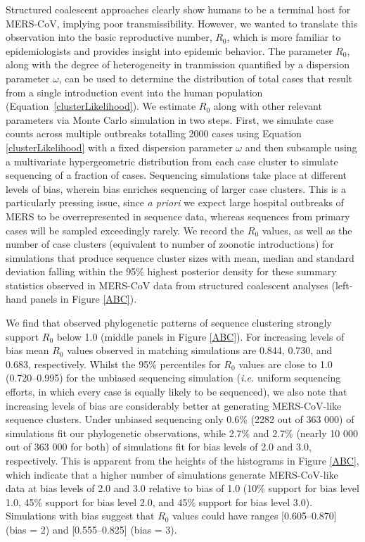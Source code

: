 \documentclass[11pt,oneside,letterpaper]{article}
\def\tbc#1{\textcolor{purple}{[#1]}}
\def\lmc#1{\textcolor{green}{[#1]}}
\begin{document}
Structured coalescent approaches clearly show humans to be a terminal host %
for MERS-CoV, implying poor transmissibility.
However, we wanted to translate this observation into the basic reproductive number, $R_{0}$, which is more familiar to epidemiologists and provides %
insight into epidemic behavior.
The parameter $R_{0}$, along with the degree of heterogeneity in tranmission quantified by a dispersion parameter $\omega$, can be used to determine the distribution of total cases that result from a single introduction event into the human population (Equation~\ref{clusterLikelihood}).
We estimate $R_{0}$ along with other relevant parameters via Monte Carlo simulation in two steps.
First, we simulate case counts across multiple outbreaks totalling 2000 cases using Equation \ref{clusterLikelihood} with a fixed dispersion parameter $\omega$ and then subsample using a multivariate hypergeometric distribution from each case cluster to simulate sequencing of a fraction of cases.
Sequencing simulations take place at different levels of bias, wherein bias enriches sequencing of larger case clusters.
This is a particularly pressing issue, since \textit{a priori} we expect large hospital outbreaks of MERS to be overrepresented in sequence data, whereas sequences from primary cases will be sampled exceedingly rarely.
We record the $R_{0}$ values, as well as the number of case clusters (equivalent to number of zoonotic introductions) for simulations that produce sequence cluster sizes with mean, median and standard deviation falling within the 95\% highest posterior density for these summary statistics observed in MERS-CoV data from structured coalescent analyses (left-hand panels in Figure \ref{ABC}).

We find that observed phylogenetic patterns of sequence clustering strongly support $R_{0}$ below 1.0 (middle panels in Figure \ref{ABC}).
For increasing levels of bias mean $R_{0}$ values observed in matching simulations are 0.844, 0.730, and 0.683, respectively.
Whilst the 95\% percentiles for $R_{0}$ values are close to 1.0 (0.720--0.995) for the unbiased sequencing simulation (\textit{i.e.} uniform sequencing efforts, in which every case is equally likely to be sequenced), we also note that increasing levels of bias are considerably better at generating MERS-CoV-like sequence clusters.
Under unbiased sequencing only 0.6\% (2282 out of 363 000) of simulations fit our phylogenetic observations, while 2.7\% and 2.7\%%
(nearly 10 000 out of 363 000 for both) of simulations fit for bias levels of 2.0 and 3.0, respectively.
This is apparent from the heights of the histograms in Figure \ref{ABC}, which indicate that a higher number of simulations generate MERS-CoV-like data at bias levels of 2.0 and 3.0 relative to bias of 1.0 (10\% support for bias level 1.0, 45\% support for bias level 2.0, and 45\% support for bias level 3.0).%
Simulations with bias suggest that $R_{0}$ values could have ranges [0.605--0.870] (bias = 2) and [0.555--0.825] (bias = 3).
\end{document}
